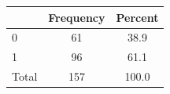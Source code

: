 \begin{tabular}{lcc}
\toprule
 & Frequency & Percent \\
\midrule
0 & 61 & 38.9 \\
1 & 96 & 61.1 \\
Total & 157 & 100.0 \\
\bottomrule
\end{tabular}
